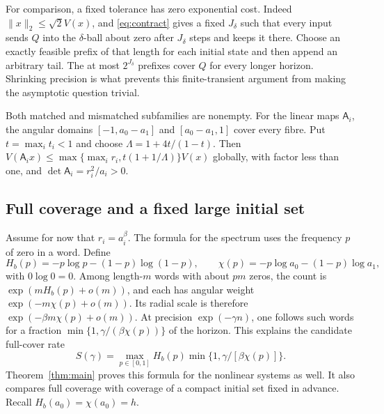 \documentclass[11pt]{amsart}
\theoremstyle{definition}
\theoremstyle{remark}
\numberwithin{equation}{section}
\begin{document}
For comparison, a fixed tolerance has zero exponential cost.
Indeed $\|x\|_2\le\sqrt2 V(x)$, and \eqref{eq:contract} gives a
fixed $J_\delta$ such that every input sends $Q$ into the
$\delta$-ball about zero after $J_\delta$ steps and keeps it there.
Choose an exactly feasible prefix of that length for each initial
state and then append an arbitrary tail. The at most
$2^{J_\delta}$ prefixes cover $Q$ for every longer horizon.
Shrinking precision is what prevents this finite-transient
argument from making the asymptotic question trivial.

Both matched and mismatched subfamilies are nonempty. For the linear
maps $\mathsf A_i$, the angular domains
$[-1,a_0-a_1]$ and $[a_0-a_1,1]$ cover every fibre.
Put $t=\max_i t_i<1$ and choose $\Lambda=1+4t/(1-t)$.
Then $V(\mathsf A_i x)\le
\max\{\max_i r_i,t(1+1/\Lambda)\}V(x)$ globally, with factor
less than one, and $\det\mathsf A_i=r_i^2/a_i>0$.

\subsection{Full coverage and a fixed large initial set}
Assume for now that $r_i=a_i^\beta$. The formula for the spectrum
uses the frequency $p$ of zero in a word. Define
\begin{equation}\label{eq:entropycost}
H_b(p)=-p\log p-(1-p)\log(1-p),\qquad
\chi(p)=-p\log a_0-(1-p)\log a_1,
\end{equation}
with $0\log0=0$. Among length-$m$ words with about $pm$ zeros,
the count is $\exp(mH_b(p)+o(m))$, and each has angular weight
$\exp(-m\chi(p)+o(m))$. Its radial scale is therefore
$\exp(-\beta m\chi(p)+o(m))$. At precision $\exp(-\gamma n)$,
one follows such words for a fraction
$\min\{1,\gamma/(\beta\chi(p))\}$ of the horizon. This explains
the candidate full-cover rate
\begin{equation}\label{eq:variational}
S(\gamma)=\max_{p\in[0,1]}H_b(p)
                  \min\{1,\gamma/[\beta\chi(p)]\}.
\end{equation}
Theorem~\ref{thm:main} proves this formula for the nonlinear
systems as well. It also compares full coverage with coverage of
a compact initial set fixed in advance. Recall
$H_b(a_0)=\chi(a_0)=h$.
\end{document}
